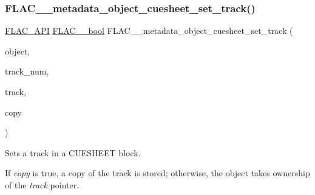 \subsubsection{\texorpdfstring{FLAC\_\_metadata\_object\_cuesheet\_set\_track()}{FLAC\_\_metadata\_object\_cuesheet\_set\_track()}}
{\footnotesize\ttfamily \mbox{\hyperlink{group__flac__export_ga56ca07df8a23310707732b1c0007d6f5}{F\+L\+A\+C\+\_\+\+A\+PI}} \mbox{\hyperlink{ordinals_8h_a95103469f1cbd78b8cf250194985b34e}{F\+L\+A\+C\+\_\+\+\_\+bool}} F\+L\+A\+C\+\_\+\+\_\+metadata\+\_\+object\+\_\+cuesheet\+\_\+set\+\_\+track (\begin{DoxyParamCaption}\item[{\mbox{\hyperlink{struct_f_l_a_c_____stream_metadata}{F\+L\+A\+C\+\_\+\+\_\+\+Stream\+Metadata}} $\ast$}]{object,  }\item[{unsigned}]{track\+\_\+num,  }\item[{\mbox{\hyperlink{struct_f_l_a_c_____stream_metadata___cue_sheet___track}{F\+L\+A\+C\+\_\+\+\_\+\+Stream\+Metadata\+\_\+\+Cue\+Sheet\+\_\+\+Track}} $\ast$}]{track,  }\item[{\mbox{\hyperlink{ordinals_8h_a95103469f1cbd78b8cf250194985b34e}{F\+L\+A\+C\+\_\+\+\_\+bool}}}]{copy }\end{DoxyParamCaption})}

Sets a track in a C\+U\+E\+S\+H\+E\+ET block.

If {\itshape copy} is {\ttfamily true}, a copy of the track is stored; otherwise, the object takes ownership of the {\itshape track} pointer.


